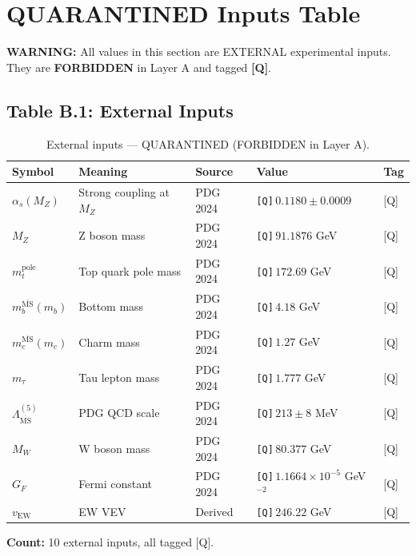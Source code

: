 \documentclass[11pt,a4paper]{article}
\newcommand{\Qnum}[1]{\textcolor{red!70!black}{\texttt{[Q]}}\,#1}
\theoremstyle{definition}
\begin{document}
\section{QUARANTINED Inputs Table}
\label{sec:inputs}

\begin{quarantinebox}
\textbf{WARNING:} All values in this section are EXTERNAL experimental inputs.
They are \textbf{FORBIDDEN} in Layer A and tagged \textbf{[Q]}.
\end{quarantinebox}

\subsection{Table B.1: External Inputs}
\label{subsec:table-b1}

\begin{table}[ht]
\centering
\caption{External inputs --- QUARANTINED (FORBIDDEN in Layer A).}
\label{tab:external-inputs}
\begin{tabular}{lllll}
\toprule
Symbol & Meaning & Source & Value & Tag \\
\midrule
$\alpha_s(M_Z)$ & Strong coupling at $M_Z$ & PDG 2024 & \Qnum{$0.1180 \pm 0.0009$} & [Q] \\
$M_Z$ & Z boson mass & PDG 2024 & \Qnum{$91.1876$ GeV} & [Q] \\
$m_t^{\text{pole}}$ & Top quark pole mass & PDG 2024 & \Qnum{$172.69$ GeV} & [Q] \\
$m_b^{\overline{\text{MS}}}(m_b)$ & Bottom mass & PDG 2024 & \Qnum{$4.18$ GeV} & [Q] \\
$m_c^{\overline{\text{MS}}}(m_c)$ & Charm mass & PDG 2024 & \Qnum{$1.27$ GeV} & [Q] \\
$m_\tau$ & Tau lepton mass & PDG 2024 & \Qnum{$1.777$ GeV} & [Q] \\
$\Lambda_{\overline{\text{MS}}}^{(5)}$ & PDG QCD scale & PDG 2024 & \Qnum{$213 \pm 8$ MeV} & [Q] \\
$M_W$ & W boson mass & PDG 2024 & \Qnum{$80.377$ GeV} & [Q] \\
$G_F$ & Fermi constant & PDG 2024 & \Qnum{$1.1664 \times 10^{-5}$ GeV$^{-2}$} & [Q] \\
$v_{\text{EW}}$ & EW VEV & Derived & \Qnum{$246.22$ GeV} & [Q] \\
\bottomrule
\end{tabular}
\end{table}

\textbf{Count:} 10 external inputs, all tagged [Q].
\end{document}
